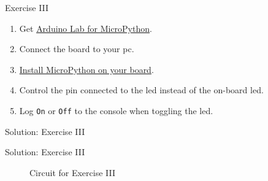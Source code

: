 \begin{frame}
    \begin{exampleblock}{Exercise III}
        \begin{enumerate}
            \item Get \href{https://docs.arduino.cc/micropython/basics/code-editors}{Arduino\textregistered{} Lab for MicroPython}.
            \item Connect the board to your \acs{pc}.
            \item \href{https://docs.arduino.cc/tutorials/nano-rp2040-connect/rp2040-python-api\#micropython-installation}{Install MicroPython on your board}.
            \item Control the pin connected to the \acs{led} instead of the on-board \acs{led}.
            \item Log \texttt{On} or \texttt{Off} to the console when toggling the \acs{led}.
        \end{enumerate}
    \end{exampleblock}
\end{frame}

\begin{frame}{Solution: Exercise III}
    \begin{listing}[H]
        \caption{Solution for Exercise III.}
        \label{lst:arduino:exercise:3:solution}
    \end{listing}
\end{frame}

\begin{frame}{Solution: Exercise III}
    \begin{figure}
        \caption{Circuit for Exercise III}
    \end{figure}
\end{frame}

